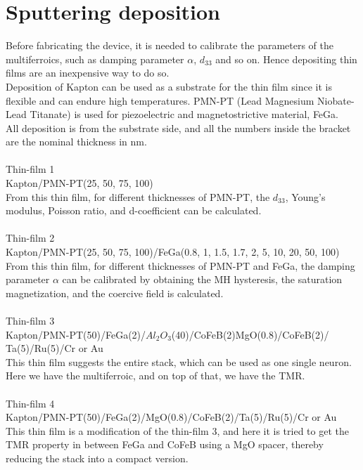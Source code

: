 \documentclass[12pt,a4paper,bold]{thesis}
\theoremstyle{thm}
\theoremstyle{definition}
\begin{document}
\section{Sputtering deposition}
Before fabricating the device, it is needed to calibrate the parameters of the multiferroics, such as damping parameter $\alpha$, $d_{33}$ and so on. Hence depositing thin films are an inexpensive way to do so.\\
Deposition of Kapton can be used as a substrate for the thin film since it is flexible and can endure high temperatures. PMN-PT (Lead Magnesium Niobate-Lead Titanate) is used for piezoelectric and magnetostrictive material, FeGa.\\
All deposition is from the substrate side, and all the numbers inside the bracket are the nominal thickness in nm.\\\\
Thin-film 1\\
Kapton/PMN-PT(25, 50, 75, 100)\\
From this thin film, for different thicknesses of PMN-PT, the $d_{33}$, Young's modulus, Poisson ratio, and d-coefficient can be calculated.\\\\
Thin-film 2\\
Kapton/PMN-PT(25, 50, 75, 100)/FeGa(0.8, 1, 1.5, 1.7, 2, 5, 10, 20, 50, 100)\\
From this thin film, for different thicknesses of PMN-PT and FeGa, the damping parameter $\alpha$ can be calibrated by obtaining the MH hysteresis, the saturation magnetization, and the coercive field is calculated.\\\\
Thin-film 3\\
Kapton/PMN-PT(50)/FeGa(2)/$Al_2O_3$(40)/CoFeB(2)MgO(0.8)/CoFeB(2)/\\Ta(5)/Ru(5)/Cr or Au\\
This thin film suggests the entire stack, which can be used as one single neuron. Here we have the multiferroic, and on top of that, we have the TMR.\\\\
Thin-film 4\\
Kapton/PMN-PT(50)/FeGa(2)/MgO(0.8)/CoFeB(2)/Ta(5)/Ru(5)/Cr or Au\\
This thin film is a modification of the thin-film 3, and here it is tried to get the TMR property in between FeGa and CoFeB using a MgO spacer, thereby reducing the stack into a compact version.\\\\
\end{document}
